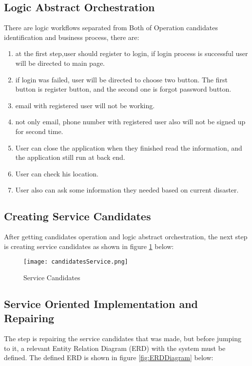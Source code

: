 \subsection{Logic Abstract Orchestration}
There are logic workflows separated from Both of Operation candidates identification and business process, there are:
\begin{enumerate}
\setlength{\itemsep}{1.5pt}
\setlength{\parskip}{1.5pt}
\item at the first step,user should register to login, if login process is successful user will be directed to main page.
\item if login was failed, user will be directed to choose two button. The first button is register button, and the second one is forgot password button.
\item email with registered user will not be working. 
\item not only email, phone number with registered user also will not be signed up for second time.
\item User can close the application when they finished read the information, and the application still run at back end.
\item User can check his location.
\item User also can ask some information they needed based on current disaster. 
\end{enumerate}

\subsection{Creating Service Candidates}
After getting candidates operation and logic abstract orchestration, the next step is creating service candidates as shown in figure \ref{fig:candidatesService} below:

\begin{figure}[H]
\centering
\texttt{[image: candidatesService.png]}
\label{fig:candidatesService}
\caption{Service Candidates}
\end{figure}

\subsection{Service Oriented Implementation and Repairing}
The step is repairing the service candidates that was made, but before jumping to it, a relevant Entity Relation Diagram (ERD) with the system must be defined. The defined ERD is shown in figure \ref{fig:ERDDiagram} below:\par

